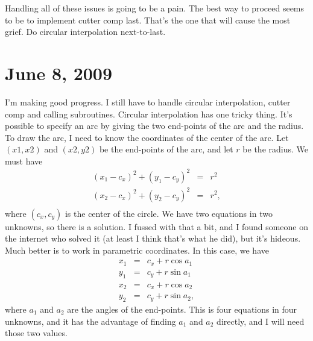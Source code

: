 \documentclass[titlepage,oneside,10pt]{article}
\begin{document}
Handling all of these issues is going to be a pain. The best way to
proceed seems to be to implement cutter comp last. That's the one that
will cause the most grief. Do circular interpolation next-to-last.

\section{June 8, 2009}

I'm making good progress. I still have to handle circular
interpolation, cutter comp and calling subroutines. Circular
interpolation has one tricky thing. It's possible to specify an arc by
giving the two end-points of the arc and the radius. To draw the arc,
I need to know the coordinates of the center of the arc. Let $(x1,x2)$
and $(x2,y2)$ be the end-points of the arc, and let $r$ be the
radius. We must have
\begin{eqnarray*}
(x_1-c_x)^2+(y_1-c_y)^2 &=& r^2\\
(x_2-c_x)^2+(y_2-c_y)^2 &=& r^2,\\
\end{eqnarray*}
where $(c_x,c_y)$ is the center of the circle. We have two equations
in two unknowns, so there is a solution. I fussed with that a bit, and
I found someone on the internet who solved it (at least I think that's
what he did), but it's hideous. Much better is to work in parametric
coordinates. In this case, we have
\begin{eqnarray*}
x_1 &=& c_x + r\cos a_1\\
y_1 &=& c_y + r\sin a_1\\
x_2 &=& c_x + r\cos a_2\\
y_2 &=& c_y + r\sin a_2,
\end{eqnarray*}
where $a_1$ and $a_2$ are the angles of the end-points. This is four
equations in four unknowns, and it has the advantage of finding $a_1$
and $a_2$ directly, and I will need those two values.
\end{document}
